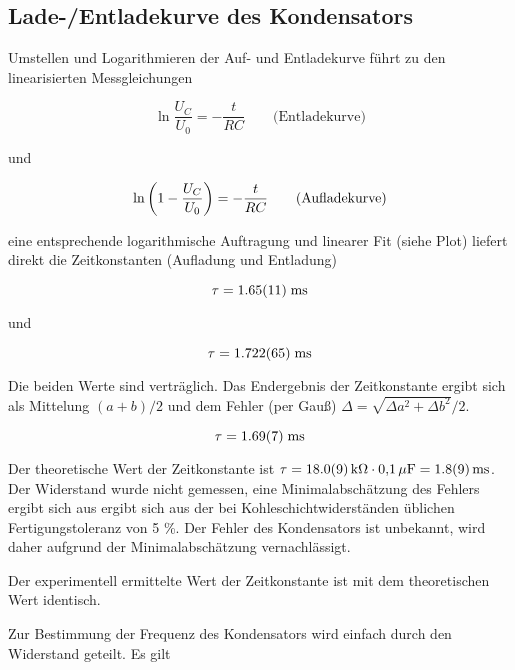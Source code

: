 \documentclass[a4paper,german,12pt,smallheadings]{scrartcl}
\begin{document}
\subsection{Lade-/Entladekurve des Kondensators}

Umstellen und Logarithmieren der Auf- und Entladekurve führt zu den
linearisierten Messgleichungen

\begin{equation}
  \ln \frac{U_C}{U_0} = -\frac{t}{RC} \qquad \text{(Entladekurve)}
\end{equation}

und

\begin{equation}
  \ln \del{1 - \frac{U_C}{U_0}} = -\frac{t}{RC} \qquad \text{(Aufladekurve)}
\end{equation}

eine entsprechende logarithmische Auftragung und linearer Fit (siehe Plot)
liefert direkt die Zeitkonstanten (Aufladung und Entladung)

\begin{equation}
  \tau = \num{1.65+-0.11} \; \text{ms}
\end{equation}

und

\begin{equation}
  \tau = \num{1.722+-0.065} \; \text{ms}
\end{equation}

Die beiden Werte sind verträglich. Das Endergebnis der Zeitkonstante ergibt
sich als Mittelung $(a+b)/2$ und dem Fehler (per Gauß) $\Delta = \sqrt{\Delta
a^2 + \Delta b^2}/2$.

\begin{equation}
  \tau = \num{1.69\pm0.07} \; \text{ms}
\end{equation}

Der theoretische Wert der Zeitkonstante ist $\tau =
\num{18.0+-0.9}\,\text{k}\Omega \cdot 0{,}1\,\mathrm{\mu} \text{F} =
\num{1.8+-0.9} \, \text{ms}$. Der Widerstand wurde nicht gemessen, eine
Minimalabschätzung des Fehlers ergibt sich aus ergibt sich aus der bei
Kohleschichtwiderständen üblichen Fertigungstoleranz von 5 \%. Der Fehler des
Kondensators ist unbekannt, wird daher aufgrund der Minimalabschätzung
vernachlässigt.

Der experimentell ermittelte Wert der Zeitkonstante ist mit dem theoretischen
Wert identisch.

Zur Bestimmung der Frequenz des Kondensators wird einfach durch den Widerstand
geteilt. Es gilt
\end{document}
